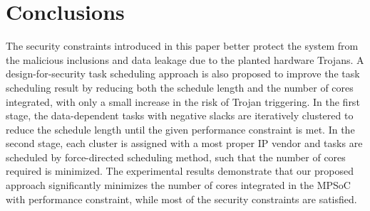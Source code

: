 \documentclass[conference]{IEEEtran}
\begin{document}


\section{Conclusions}

The security constraints introduced in this paper better protect the system from the malicious inclusions and data leakage due to the planted hardware Trojans. A design-for-security task scheduling approach is also proposed to improve the task scheduling result by reducing both the schedule length and the number of cores integrated, with only a small increase in the risk of Trojan triggering. In the first stage, the data-dependent tasks with negative slacks are iteratively clustered to reduce the schedule length until the given performance constraint is met. In the second stage, each cluster is assigned with a most proper IP vendor and tasks are scheduled by force-directed scheduling method, such that the number of cores required is minimized. The experimental results demonstrate that our proposed approach significantly minimizes the number of cores integrated in the MPSoC with performance constraint, while most of the security constraints are satisfied.



\end{document}
